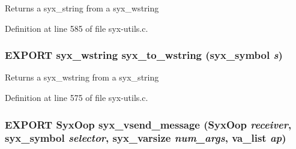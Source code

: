 Returns a syx\_\-string from a syx\_\-wstring 

Definition at line 585 of file syx-utils.c.\hypertarget{syx-utils_8h_2d9ceb54c05ac4eb22988697388a1409}{
\subsubsection{\setlength{\rightskip}{0pt plus 5cm}EXPORT {\bf syx\_\-wstring} syx\_\-to\_\-wstring ({\bf syx\_\-symbol} {\em s})}}
\label{syx-utils_8h_2d9ceb54c05ac4eb22988697388a1409}


Returns a syx\_\-wstring from a syx\_\-string 

Definition at line 575 of file syx-utils.c.\hypertarget{syx-utils_8h_cea22d4450dbe695ee66ed7d1211666d}{
\subsubsection{\setlength{\rightskip}{0pt plus 5cm}EXPORT {\bf SyxOop} syx\_\-vsend\_\-message ({\bf SyxOop} {\em receiver}, \/  {\bf syx\_\-symbol} {\em selector}, \/  {\bf syx\_\-varsize} {\em num\_\-args}, \/  va\_\-list {\em ap})}}
\label{syx-utils_8h_cea22d4450dbe695ee66ed7d1211666d}


